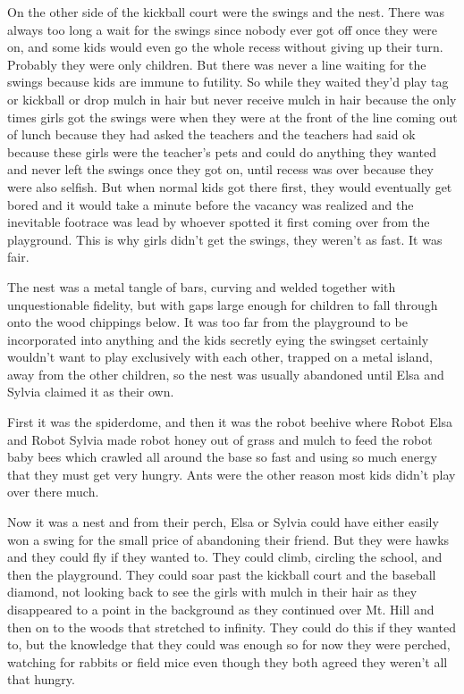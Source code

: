   On the other side of the kickball court were the swings and the nest. There was always too long a wait for the swings since nobody ever got off once they were on, and some kids would even go the whole recess without giving up their turn. Probably they were only children. But there was never a line waiting for the swings because kids are immune to futility. So while they waited they'd play tag or kickball or drop mulch in hair but never receive mulch in hair because the only times girls got the swings were when they were at the front of the line coming out of lunch because they had asked the teachers and the teachers had said ok because these girls were the teacher's pets and could do anything they wanted and never left the swings once they got on, until recess was over because they were also selfish. But when normal kids got there first, they would eventually get bored and it would take a minute before the vacancy was realized and the inevitable footrace was lead by whoever spotted it first coming over from the playground. This is why girls didn't get the swings, they weren't as fast. It was fair.

  The nest was a metal tangle of bars, curving and welded together with unquestionable fidelity, but with gaps large enough for children to fall through onto the wood chippings below. It was too far from the playground to be incorporated into anything and the kids secretly eying the swingset certainly wouldn't want to play exclusively with each other, trapped on a metal island, away from the other children, so the nest was usually abandoned until Elsa and Sylvia claimed it as their own. 

  First it was the spiderdome, and then it was the robot beehive where Robot Elsa and Robot Sylvia made robot honey out of grass and mulch to feed the robot baby bees which crawled all around the base so fast and using so much energy that they must get very hungry. Ants were the other reason most kids didn't play over there much. 

  Now it was a nest and from their perch, Elsa or Sylvia could have either easily won a swing for the small price of abandoning their friend. But they were hawks and they could fly if they wanted to. They could climb, circling the school, and then the playground. They could soar past the kickball court and the baseball diamond, not looking back to see the girls with mulch in their hair as they disappeared to a point in the background as they continued over Mt. Hill and then on to the woods that stretched to infinity. They could do this if they wanted to, but the knowledge that they could was enough so for now they were perched, watching for rabbits or field mice even though they both agreed they weren't all that hungry. %

\mymark

%
